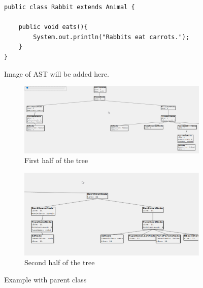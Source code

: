 \documentclass[a4paper]{article}
\begin{document}
\begin{figure}[h!]
\begin{center}
\begin{lstlisting}
public class Rabbit extends Animal {

	public void eats(){
		System.out.println("Rabbits eat carrots.");	
	}
}
\end{lstlisting}
Image of AST will be added here.\\
     \centering
     \begin{subfigure}[b]{\textwidth}
         \centering
         \includegraphics[width=\textwidth]{rabbit_ast1}
         \caption{First half of the tree}
     \end{subfigure}
     \quad
     \begin{subfigure}[b]{\textwidth}
         \centering
         \includegraphics[width=\textwidth]{rabbit_ast2}
         \caption{Second half of the tree}
     \end{subfigure}

\caption{Example with parent class}
\label{fig:ast3}
\end{center}
\end{figure}
\end{document}
